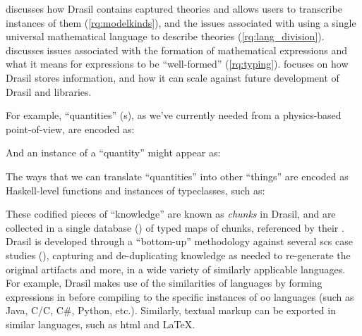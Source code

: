  discusses how Drasil contains captured theories and
allows users to transcribe instances of them (\ref{rq:modelkinds}), and the
issues associated with using a single universal mathematical language to
describe theories (\ref{rq:lang_division}).  discusses
issues associated with the formation of mathematical expressions and what it
means for expressions to be ``well-formed'' (\ref{rq:typing}).
 focuses on how Drasil stores information, and how it
can scale against future development of Drasil and libraries.









































For example, ``quantities'' (\QuantityDict{}s), as we've currently needed from a
physics-based point-of-view, are encoded as:

\originalQuantityDictHaskell{}

And an instance of a ``quantity'' might appear as:\\

\originalQuantityDictExampleHaskell{}

The ways that we can translate ``quantities'' into other ``things'' are encoded
as Haskell-level functions and instances of typeclasses, such as:


These codified pieces of ``knowledge'' are known as \textit{chunks} in Drasil,
and are collected in a single database () of typed
maps of chunks, referenced by their . Drasil is developed through a
``bottom-up'' methodology against several \acs{scs} case studies
(), capturing and de-duplicating knowledge as needed to
re-generate the original artifacts and more, in a wide variety of similarly
applicable languages. For example, Drasil makes use of the similarities of
 languages by forming expressions in  before compiling to the
specific instances of \acs{oo} languages (such as Java, C/C\+\+, C\#, Python,
etc.). Similarly, textual markup can be exported in similar languages, such as
\acs{html} and \LaTeX{}.

